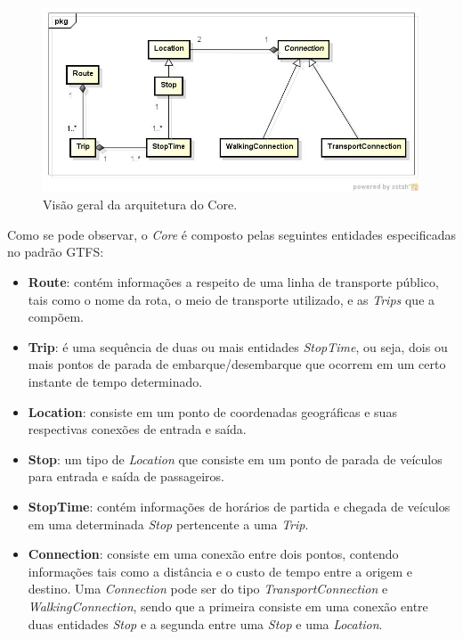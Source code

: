 \begin{figure}[!htb]
	\centering
	\includegraphics[width=1\textwidth]{./CoreDiagram.jpg}
	\caption[Arquitetura do Core]{Visão geral da arquitetura do Core.}
	\label{fig:core}
\end{figure}

Como se pode observar, o \emph{Core} é composto pelas seguintes entidades especificadas no padrão GTFS:

\begin{itemize}
	\item \textbf{Route}: contém informações a respeito de uma linha de transporte público, tais como o nome da rota, o meio de transporte utilizado, e as \emph{Trips} que a compõem.
	\item \textbf{Trip}: é uma sequência de duas ou mais entidades \emph{StopTime}, ou seja, dois ou mais pontos de parada de embarque/desembarque que ocorrem em um certo instante de tempo determinado.
	\item \textbf{Location}: consiste em um ponto de coordenadas geográficas e suas respectivas conexões de entrada e saída.
	\item \textbf{Stop}: um tipo de \emph{Location} que consiste em um ponto de parada de veículos para entrada e saída de passageiros.
	\item \textbf{StopTime}: contém informações de horários de partida e chegada de veículos em uma determinada \emph{Stop} pertencente a uma \emph{Trip}.
	\item \textbf{Connection}: consiste em uma conexão entre dois pontos, contendo informações tais como a distância e o custo de tempo entre a origem e destino. 
								Uma \emph{Connection} pode ser do tipo \emph{TransportConnection} e \emph{WalkingConnection}, sendo que a primeira consiste em uma 										conexão entre duas entidades \emph{Stop} e a segunda entre uma \emph{Stop} e uma \emph{Location}.
\end{itemize}

